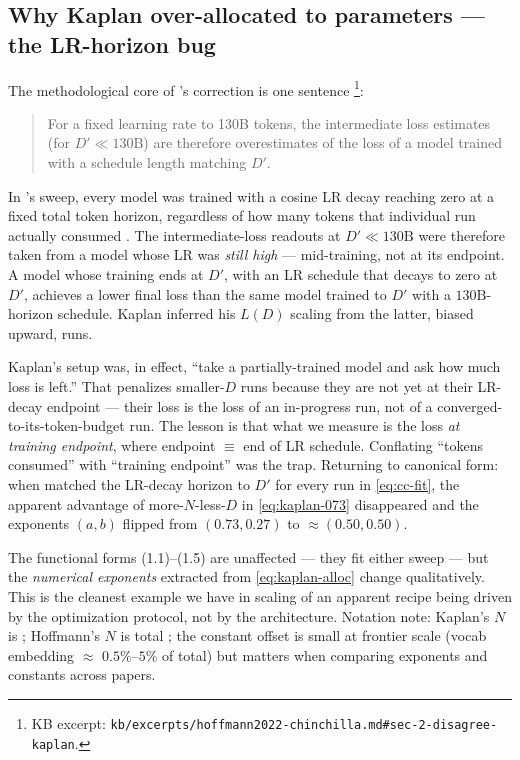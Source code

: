 \subsection{Why Kaplan over-allocated to parameters --- the LR-horizon bug}
\label{sec:scaling-lrhorizon}

The methodological core of \citeauthor{hoffmann2022-chinchilla}'s
correction is one sentence \citep[\S 2]{hoffmann2022-chinchilla}\footnote{KB
excerpt: \nolinkurl{kb/excerpts/hoffmann2022-chinchilla.md#sec-2-disagree-kaplan}.}:

\begin{quote}
For a fixed learning rate  to 130B tokens, the
intermediate loss estimates (for $D' \ll 130\text{B}$) are therefore
overestimates of the loss of a model trained with a schedule length
matching $D'$.
\end{quote}

In \citet{kaplan2020}'s sweep, every model was trained with a cosine
LR decay reaching zero at a fixed total token horizon, regardless of
how many tokens that individual run actually consumed
\citep[\S 2.2]{kaplan2020}. The intermediate-loss readouts at $D'
\ll 130\text{B}$ were therefore taken from a model whose LR was
\emph{still high} --- mid-training, not at its endpoint. A model
whose training ends at $D'$, with an LR schedule that decays to zero at
$D'$, achieves a lower final loss than the same model trained to $D'$
with a $130\text{B}$-horizon schedule. Kaplan inferred his $L(D)$
scaling from the latter, biased upward, runs.

\begin{intuition}
Kaplan's setup was, in effect, ``take a partially-trained model and
ask how much loss is left.'' That penalizes smaller-$D$ runs because
they are not yet at their LR-decay endpoint --- their loss is the
loss of an in-progress run, not of a converged-to-its-token-budget
run. The lesson is that what we measure is the loss \emph{at training
endpoint}, where endpoint $\equiv$ end of LR schedule. Conflating
``tokens consumed'' with ``training endpoint'' was the trap. Returning
to canonical form: when \citet{hoffmann2022-chinchilla} matched the
LR-decay horizon to $D'$ for every run in
\cref{eq:cc-fit}, the apparent advantage of more-$N$-less-$D$ in
\cref{eq:kaplan-073} disappeared and the exponents $(a, b)$ flipped
from $(0.73, 0.27)$ to $\approx (0.50, 0.50)$.
\end{intuition}

The functional forms (1.1)--(1.5) are unaffected --- they fit either
sweep --- but the \emph{numerical exponents} extracted from
\cref{eq:kaplan-alloc} change qualitatively. This is the cleanest
example we have in  scaling of an apparent recipe being driven by
the optimization protocol, not by the architecture. Notation note:
Kaplan's $N$ is 
\citep[\S 1.3]{kaplan2020}; Hoffmann's $N$ is total ; the
constant offset is small at frontier scale (vocab embedding $\approx$
$0.5\%$--$5\%$ of total) but matters when comparing exponents and
constants across papers.

